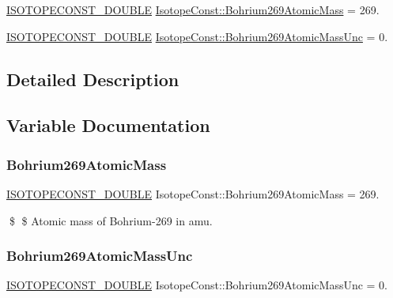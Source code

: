 \begin{DoxyCompactItemize}
\item 
\mbox{\hyperlink{group___isotope_const-_macros_ga8f45a7272ce02c0b4c65c44636ed719a}{I\+S\+O\+T\+O\+P\+E\+C\+O\+N\+S\+T\+\_\+\+D\+O\+U\+B\+LE}} \mbox{\hyperlink{group___isotope_const-_bohrium-_bh269_ga1b3ff1ab1a3cc2aad21e9e3cd5621720}{Isotope\+Const\+::\+Bohrium269\+Atomic\+Mass}} = 269.
\item 
\mbox{\hyperlink{group___isotope_const-_macros_ga8f45a7272ce02c0b4c65c44636ed719a}{I\+S\+O\+T\+O\+P\+E\+C\+O\+N\+S\+T\+\_\+\+D\+O\+U\+B\+LE}} \mbox{\hyperlink{group___isotope_const-_bohrium-_bh269_ga075d5e0871ac0f891551971079df638c}{Isotope\+Const\+::\+Bohrium269\+Atomic\+Mass\+Unc}} = 0.
\end{DoxyCompactItemize}


\subsection{Detailed Description}


\subsection{Variable Documentation}
\mbox{\label{group___isotope_const-_bohrium-_bh269_ga1b3ff1ab1a3cc2aad21e9e3cd5621720}} 
\subsubsection{\texorpdfstring{Bohrium269\+Atomic\+Mass}{Bohrium269AtomicMass}}
{\footnotesize\ttfamily \mbox{\hyperlink{group___isotope_const-_macros_ga8f45a7272ce02c0b4c65c44636ed719a}{I\+S\+O\+T\+O\+P\+E\+C\+O\+N\+S\+T\+\_\+\+D\+O\+U\+B\+LE}} Isotope\+Const\+::\+Bohrium269\+Atomic\+Mass = 269.}

\$ \$ Atomic mass of Bohrium-\/269 in amu. \mbox{\label{group___isotope_const-_bohrium-_bh269_ga075d5e0871ac0f891551971079df638c}} 
\subsubsection{\texorpdfstring{Bohrium269\+Atomic\+Mass\+Unc}{Bohrium269AtomicMassUnc}}
{\footnotesize\ttfamily \mbox{\hyperlink{group___isotope_const-_macros_ga8f45a7272ce02c0b4c65c44636ed719a}{I\+S\+O\+T\+O\+P\+E\+C\+O\+N\+S\+T\+\_\+\+D\+O\+U\+B\+LE}} Isotope\+Const\+::\+Bohrium269\+Atomic\+Mass\+Unc = 0.}

